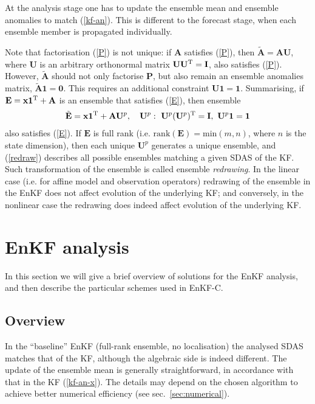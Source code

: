 \documentclass[11pt]{report}
\newcommand{\mb} {\mathbf}
\newcommand{\T}{^{\tiny \mathrm T}}
\begin{document}
At the analysis stage one has to update the ensemble mean and ensemble anomalies to match (\ref{kf-an}).
This is different to the forecast stage, when each ensemble member is propagated individually.

Note that factorisation (\ref{P}) is not unique: if $\mb A$ satisfies (\ref{P}), then $\tilde {\mb A} = \mb A \mb U$, where $\mb U$ is an arbitrary orthonormal matrix $\mb U \mb U\T = \mb I$, also satisfies (\ref{P}).
However, $\tilde{\mb A}$ should not only factorise $\mb P$, but also remain an ensemble anomalies matrix, $\tilde{\mb A} \mb 1 = \mb 0$.
This requires an additional constraint $\mb U \mb 1 = \mb 1$.
Summarising, if $\mb E = \mb x \mb 1\T + \mb A$ is an ensemble that satisfies (\ref{E}), then ensemble
\begin{align}
  \label{redraw}
  \tilde{\mb E} = \mb x \mb 1\T + \mb A \mb U^p, \quad \mb U^p:\ \mb U^p (\mb U^p)\T = \mb I,\ \mb U^p \mb 1 = \mb 1
\end{align}
also satisfies (\ref{E}). 
If $\mb E$ is full rank (i.e. $\mathrm{rank}(\mb E) = \mathrm{min}(m, n)$, where $n$ is the state dimension), then each unique $\mb U^p$ generates a unique ensemble, and (\ref{redraw}) describes all possible ensembles matching a given SDAS of the KF.
Such transformation of the ensemble is called ensemble \emph{redrawing}.
In the linear case (i.e. for affine model and observation operators) redrawing of the ensemble in the EnKF does not affect evolution of the underlying KF; and conversely, in the nonlinear case the redrawing does indeed affect evolution of the underlying KF.

\section{EnKF analysis}

In this section we will give a brief overview of solutions for the EnKF analysis, and then describe the particular schemes used in EnKF-C.

\subsection{Overview}

In the ``baseline'' EnKF (full-rank ensemble, no localisation) the analysed SDAS matches that of the KF, although the algebraic side is indeed different.
The update of the ensemble mean is generally straightforward, in accordance with that in the KF (\ref{kf-an-x}).
The details may depend on the chosen algorithm to achieve better numerical efficiency (see sec.~\ref{sec:numerical}).
\end{document}
